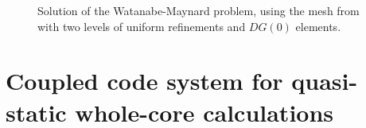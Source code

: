 \begin{figure}[!ht]
\centering
{}
  \caption[Solution of the Watanabe-Maynard problem -- refined mesh]{Solution of the Watanabe-Maynard problem, using
   the mesh from  with two levels of uniform refinements and $DG(0)$ elements.}
  \label{fig:23}
\end{figure}


\section{Coupled code system for quasi-static whole-core calculations}\label{sec:coupled}

